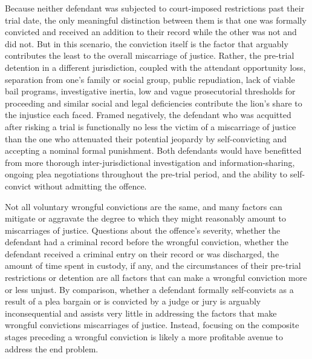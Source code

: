 Because neither defendant was subjected to court-imposed restrictions past their trial date, the only meaningful distinction between them is that one was formally convicted and received an addition to their record while the other was not and did not. But in this scenario, the conviction itself is the factor that arguably contributes the least to the overall miscarriage of justice. Rather, the pre-trial detention in a different jurisdiction, coupled with the attendant opportunity loss, separation from one's family or social group, public repudiation, lack of viable bail programs, investigative inertia, low and vague prosecutorial thresholds for proceeding and similar social and legal deficiencies contribute the lion's share to the injustice each faced. Framed negatively, the defendant who was acquitted after risking a trial is functionally no less the victim of a miscarriage of justice than the one who attenuated their potential jeopardy by self-convicting and accepting a nominal formal punishment. Both defendants would have benefitted from more thorough inter-jurisdictional investigation and information-sharing, ongoing plea negotiations throughout the pre-trial period, and the ability to self-convict without admitting the offence.

Not all voluntary wrongful convictions are the same, and many factors can mitigate or aggravate the degree to which they might reasonably amount to miscarriages of justice. Questions about the offence's severity, whether the defendant had a criminal record before the wrongful conviction, whether the defendant received a criminal entry on their record or was discharged, the amount of time spent in custody, if any, and the circumstances of their pre-trial restrictions or detention are all factors that can make a wrongful conviction more or less unjust. By comparison, whether a defendant formally self-convicts as a result of a plea bargain or is convicted by a judge or jury is arguably inconsequential and assists very little in addressing the factors that make wrongful convictions miscarriages of justice. Instead, focusing on the composite stages preceding a wrongful conviction is likely a more profitable avenue to address the end problem. 

